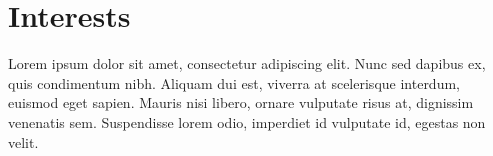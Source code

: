 \documentclass{resume}
\begin{document}
\section{Interests}
\noindent Lorem ipsum dolor sit amet, consectetur adipiscing elit. Nunc sed dapibus ex, quis condimentum nibh. Aliquam dui est, viverra at scelerisque interdum, euismod eget sapien. Mauris nisi libero, ornare vulputate risus at, dignissim venenatis sem. Suspendisse lorem odio, imperdiet id vulputate id, egestas non velit.
\end{document}
